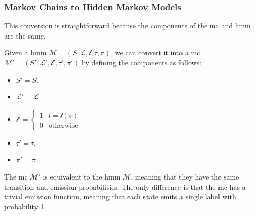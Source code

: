 \subsubsection{Markov Chains to Hidden Markov Models}\label{subsec:mc2hmm}
This conversion is straightforward because the components of the \gls{mc} and \gls{hmm} are the same.
\begin{definition}
    Given a \gls{hmm} $\mathcal{M} = (S, \mathcal{L}, \mathscr{l}, \tau,  \pi)$, we can convert it into a \gls{mc} $\mathcal{M}' = (S', \mathcal{L}', \mathscr{l}', \tau',  \pi')$ by defining the components as follows:
    \begin{itemize}
        \item $S' = S$.
        \item $\mathcal{L}' = \mathcal{L}$.
        \item $\mathscr{l}' =  \begin{cases}
                      1 & l=\mathscr{l}(s) \\
                      0 & \text{otherwise}
                  \end{cases}$
        \item $\tau' = \tau$.
        \item $\pi' = \pi$.
    \end{itemize}
\end{definition}
The \gls{mc} $\mathcal{M}'$ is equivalent to the \gls{hmm} $\mathcal{M}$, meaning that they have the same transition and emission probabilities.
The only difference is that the \gls{mc} has a trivial emission function, meaning that each state emits a single label with probability 1.

